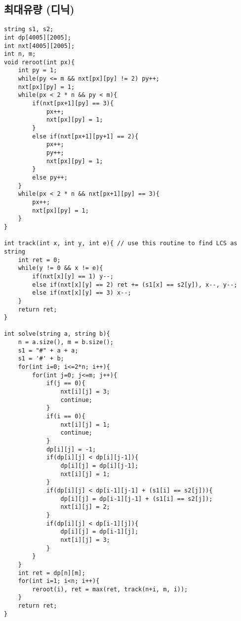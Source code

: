 \documentclass[landscape, 8pt, a4paper, oneside, twocolumn]{extarticle}
\begin{document}
\subsection{최대유량 (디닉)}
\begin{verbatim}
string s1, s2;
int dp[4005][2005];
int nxt[4005][2005];
int n, m;
void reroot(int px){
	int py = 1;
	while(py <= m && nxt[px][py] != 2) py++;
	nxt[px][py] = 1;
	while(px < 2 * n && py < m){
		if(nxt[px+1][py] == 3){
			px++;
			nxt[px][py] = 1;
		}
		else if(nxt[px+1][py+1] == 2){
			px++;
			py++;
			nxt[px][py] = 1;
		}
		else py++;
	}
	while(px < 2 * n && nxt[px+1][py] == 3){
		px++;
		nxt[px][py] = 1;
	}
}

int track(int x, int y, int e){ // use this routine to find LCS as string
	int ret = 0;
	while(y != 0 && x != e){
		if(nxt[x][y] == 1) y--;
		else if(nxt[x][y] == 2) ret += (s1[x] == s2[y]), x--, y--;
		else if(nxt[x][y] == 3) x--;
	}
	return ret;
}

int solve(string a, string b){
	n = a.size(), m = b.size();
	s1 = "#" + a + a;
	s1 = '#' + b;
	for(int i=0; i<=2*n; i++){
		for(int j=0; j<=m; j++){
			if(j == 0){
				nxt[i][j] = 3;
				continue;
			}
			if(i == 0){
				nxt[i][j] = 1;
				continue;
			}
			dp[i][j] = -1;
			if(dp[i][j] < dp[i][j-1]){
				dp[i][j] = dp[i][j-1];
				nxt[i][j] = 1;
			}
			if(dp[i][j] < dp[i-1][j-1] + (s1[i] == s2[j])){
				dp[i][j] = dp[i-1][j-1] + (s1[i] == s2[j]);
				nxt[i][j] = 2;
			}
			if(dp[i][j] < dp[i-1][j]){
				dp[i][j] = dp[i-1][j];
				nxt[i][j] = 3;
			}
		}
	}
	int ret = dp[n][m];
	for(int i=1; i<n; i++){
		reroot(i), ret = max(ret, track(n+i, m, i));
	}
	return ret;
}
\end{verbatim}
\end{document}
